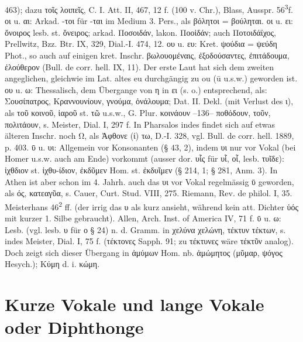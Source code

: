 463); dazu τοῖς λοιπεῖς, C. I. Att. II, 467, 12 f. (100 v. Chr.), Blass, Ausspr. 56\textsuperscript{3}f. οι u. αι: Arkad. -τοι für -ται im Medium 3. Pers., als βόλητοι = βούληται. οι u. ει: ὄνοιρος lesb. st. ὄνειρος; arkad. Ποσοιδάν, lakon. Ποοἱδάν; auch  Ποτοιδάϊχος, Prellwitz, Bzz. Btr. IX, 329, Dial.-I. 474, 12. ου u. ευ: Kret. ψούδια = ψεύδη Phot., so auch auf einigen kret. Inschr. βωλουομέναις, ἐξοδούσαντες, ἐπιτάδουμα, ἐλούθερον (Bull. de corr. hell. IX, 11). Der erste Laut hat sich dem zweiten angeglichen, gleichwie im Lat. altes eu durchgängig zu ou (ū u.s.w.) geworden ist. ου u. ω: Thessalisch, dem Übergange von η in ει (s. o.) entsprechend, als: Σουσίπατρος, Κραννουνίουν, γνούμα, ὀνάλουμα; Dat. II. Dekl. (mit Verlust des ι), als τοῦ κοινοῦ, ἱαροῦ st. τῶ u.s.w., G. Plur. κοινάουν --136-- ποθόδουν, τοῦν, πολιτάουν, s. Meister, Dial. I, 297 f. In Pharsalos indes findet sich auf etwas älteren Inschr. noch Ω, als Ἀφθονε (ί) τω, D.-I. 328, vgl. Bull. de corr. hell. 1889, p. 403. ῡ u. υι: Allgemein vor Konsonanten (§ 43, 2), indem υι nur vor Vokal (bei Homer u.s.w. auch am Ende) vorkommt (ausser dor. υἷς für υἷ, οἷ, lesb. τυῖδε): ἰχθδιον st. ἰχθυ-ίδιον, ἐκδῦμεν Hom. st. ἐκδυῖμεν (§ 214, 1; § 281, Anm. 3). In Athen ist aber schon im 4. Jahrh. auch das υι vor Vokal regelmässig ῡ geworden, als ός, κατεαγῦα, s. Cauer, Curt. Stud. VIII, 275. Riemann, Rev. de philol. I, 35. Meisterhans 46\textsuperscript{2} ff. (der irrig das υ als kurz ansieht, während kein att. Dichter ὑός mit kurzer 1. Silbe gebraucht). Allen, Arch. Inst. of America IV, 71 f. ῡ u. ω: Lesb. (vgl. lesb. υ für ο § 24) n. d. Gramm. in χελύνα χελώνη, τέκτυν τέκτων, s. indes Meister, Dial. I, 75 f. (τέκτονες Sapph. 91; zu τέκτυνες wäre τέκτῦν analog). Doch zeigt sich dieser Übergang in ἀμύμων Hom. nb. ἀμώμητος (μῦμαρ, ψόγος Hesych.); Κύμη d. i. κώμη.
\section{Kurze Vokale und lange Vokale oder Diphthonge}

